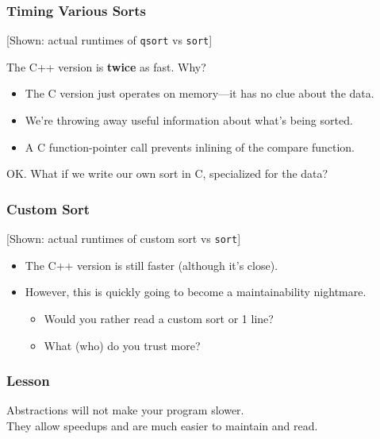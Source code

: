 \begin{frame}
  \frametitle{Timing Various Sorts}

  
  \begin{center}
    [Shown: actual runtimes of {\tt qsort} vs {\tt sort}]\\[1em]
  \end{center}

     The C++ version is {\bf twice} as fast. Why?
      \begin{itemize}
        \item The C version just operates on memory---it has no clue about the
          data.
        \item We're throwing away useful information about what's being sorted.
        \item A C function-pointer call prevents inlining of the compare function.
      \end{itemize}
     OK. What if we write our own sort in C, specialized for the data?
  
\end{frame}

\begin{frame}
  \frametitle{Custom Sort}


  \begin{center}
    [Shown: actual runtimes of custom sort vs {\tt sort}]
  \end{center}

  \begin{itemize}
    \item The C++ version is still faster (although it's close).
    \item However, this is quickly going to become a maintainability nightmare.
      \begin{itemize}
        \item Would you rather read a custom sort or 1 line?
        \item What (who) do you trust more?
      \end{itemize}
  \end{itemize}
  

\end{frame}

\begin{frame}
  \frametitle{Lesson}
  
\Huge
    Abstractions will not make your program slower. \\[1em]

    They 
      allow speedups and are much easier to maintain and read.
  
\end{frame}

